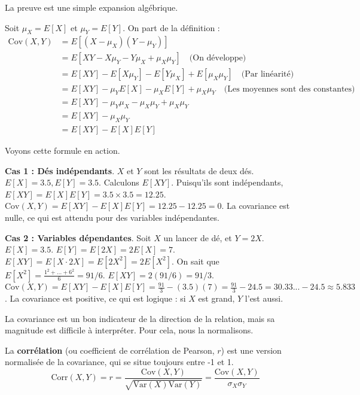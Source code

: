 La preuve est une simple expansion algébrique.

\begin{proofbox}
Soit $\mu_X = E[X]$ et $\mu_Y = E[Y]$. On part de la définition :
\begin{align*}
\text{Cov}(X,Y) &= E[(X - \mu_X)(Y - \mu_Y)] \\
&= E[XY - X\mu_Y - Y\mu_X + \mu_X\mu_Y] \quad \text{(On développe)} \\
&= E[XY] - E[X\mu_Y] - E[Y\mu_X] + E[\mu_X\mu_Y] \quad \text{(Par linéarité)} \\
&= E[XY] - \mu_Y E[X] - \mu_X E[Y] + \mu_X\mu_Y \quad \text{(Les moyennes sont des constantes)} \\
&= E[XY] - \mu_Y \mu_X - \mu_X \mu_Y + \mu_X\mu_Y \\
&= E[XY] - \mu_X \mu_Y \\
&= E[XY] - E[X]E[Y]
\end{align*}
\end{proofbox}

Voyons cette formule en action.

\begin{examplebox}
\textbf{Cas 1 : Dés indépendants}. $X$ et $Y$ sont les résultats de deux dés. $E[X]=3.5, E[Y]=3.5$.
Calculons $E[XY]$. Puisqu'ils sont indépendants, $E[XY] = E[X]E[Y] = 3.5 \times 3.5 = 12.25$.
$\text{Cov}(X,Y) = E[XY] - E[X]E[Y] = 12.25 - 12.25 = 0$.
La covariance est nulle, ce qui est attendu pour des variables indépendantes.

\textbf{Cas 2 : Variables dépendantes}. Soit $X$ un lancer de dé, et $Y = 2X$.
$E[X] = 3.5$. $E[Y] = E[2X] = 2E[X] = 7$.
$E[XY] = E[X \cdot 2X] = E[2X^2] = 2 E[X^2]$.
On sait que $E[X^2] = \frac{1^2+...+6^2}{6} = 91/6$.
$E[XY] = 2(91/6) = 91/3$.
$\text{Cov}(X,Y) = E[XY] - E[X]E[Y] = \frac{91}{3} - (3.5)(7) = \frac{91}{3} - 24.5 = 30.33... - 24.5 \approx 5.833$.
La covariance est positive, ce qui est logique : si $X$ est grand, $Y$ l'est aussi.
\end{examplebox}

La covariance est un bon indicateur de la direction de la relation, mais sa magnitude est difficile à interpréter. Pour cela, nous la normalisons.

\begin{definitionbox}[Corrélation]
La \textbf{corrélation} (ou coefficient de corrélation de Pearson, $r$) est une version normalisée de la covariance, qui se situe toujours entre -1 et 1.
$$\text{Corr}(X,Y) = r = \frac{\text{Cov}(X,Y)}{\sqrt{\text{Var}(X)\text{Var}(Y)}} = \frac{\text{Cov}(X,Y)}{\sigma_X \sigma_Y}$$
\end{definitionbox}

